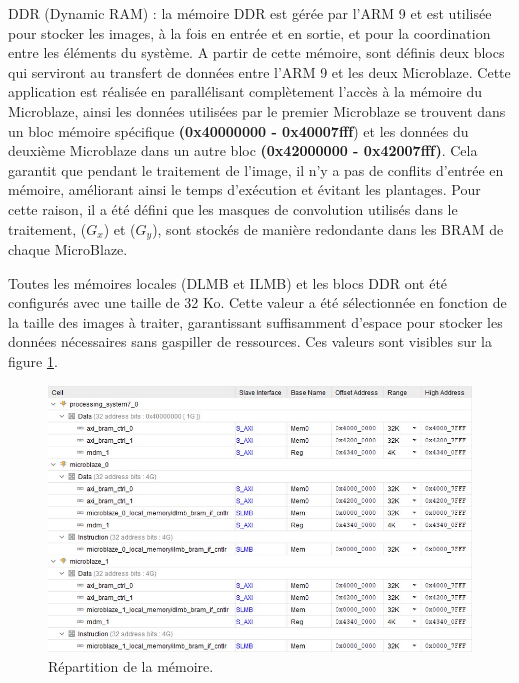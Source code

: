 \documentclass[../CSC_5RO07_TA.tex]{subfiles}
\begin{document}
\vspace{1em} 
DDR (Dynamic RAM) : la mémoire DDR est gérée par l'ARM 9 et est utilisée pour stocker les images, à la fois en entrée et en sortie, et pour la coordination entre les éléments du système. A partir de cette mémoire, sont définis deux blocs qui serviront au transfert de données entre l'ARM 9 et les deux Microblaze. Cette application est réalisée en parallélisant complètement l'accès à la mémoire du Microblaze, ainsi les données utilisées par le premier Microblaze se trouvent dans un bloc mémoire spécifique \textbf{(0x40000000 - 0x40007fff}) et les données du deuxième Microblaze dans un autre bloc \textbf{(0x42000000 - 0x42007fff)}. Cela garantit que pendant le traitement de l'image, il n'y a pas de conflits d'entrée en mémoire, améliorant ainsi le temps d'exécution et évitant les plantages. Pour cette raison, il a été défini que les masques de convolution utilisés dans le traitement, ($G_x$) et ($G_y$), sont stockés de manière redondante dans les BRAM de chaque MicroBlaze.

\vspace{1em} 

Toutes les mémoires locales (DLMB et ILMB) et les blocs DDR ont été configurés avec une taille de 32 Ko. Cette valeur a été sélectionnée en fonction de la taille des images à traiter, garantissant suffisamment d'espace pour stocker les données nécessaires sans gaspiller de ressources. Ces valeurs sont visibles sur la figure \ref{fig:4}.

\begin{figure}[H]
    \centering
    \includegraphics[width=1.0\columnwidth]{./images/Memoria.jpg}
    \caption{Répartition de la mémoire.}
    \label{fig:4}
\end{figure}
\end{document}
